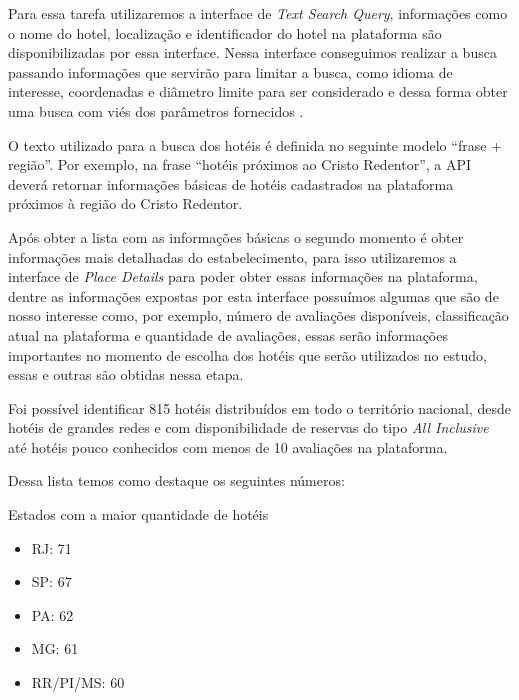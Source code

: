 Para essa tarefa utilizaremos a interface de \emph{Text Search Query}, informações como o nome do hotel, localização e identificador do hotel na plataforma são disponibilizadas por essa interface. Nessa interface conseguimos realizar a busca passando informações que servirão para limitar a busca, como idioma de interesse, coordenadas e diâmetro limite para ser considerado e dessa forma obter uma busca com viés dos parâmetros fornecidos \cite{placesSearchText2023}.



O texto utilizado para a busca dos hotéis é definida no seguinte modelo “frase + região”. Por exemplo, na frase “hotéis próximos ao Cristo Redentor”, a API deverá retornar informações básicas de hotéis cadastrados na plataforma próximos à região do Cristo Redentor.

Após obter a lista com as informações básicas o segundo momento é obter informações mais detalhadas do estabelecimento, para isso utilizaremos a interface de \emph{Place Details} para poder obter essas informações na plataforma, dentre as informações expostas por esta interface possuímos algumas que são de nosso interesse como, por exemplo, número de avaliações disponíveis, classificação atual na plataforma e quantidade de avaliações, essas serão informações importantes no momento de escolha dos hotéis que serão utilizados no estudo, essas e outras são obtidas nessa etapa.



Foi possível identificar 815 hotéis distribuídos em todo o território nacional, desde hotéis de grandes redes e com disponibilidade de reservas do tipo \emph{All Inclusive} até hotéis pouco conhecidos com menos de 10 avaliações na plataforma.

Dessa lista temos como destaque os seguintes números:

Estados com a maior quantidade de hotéis
\begin{itemize}
	\item RJ: 71
	\item SP: 67
	\item PA: 62
	\item MG: 61
	\item RR/PI/MS: 60
\end{itemize}

